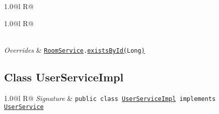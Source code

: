 \begin{adjustwidth}{1.5em}{0pt}
\begin{adjustwidth}{1.5em}{0pt}
\begin{adjustwidth}{1.5em}{0pt}
{\begin{tabularx}{1.0\linewidth}{@{}l R@{}}
{\begin{tabularx}{1.0\linewidth}{@{}l R@{}}
        \end{tabularx}} \\
        \hline
        \emph{Overrides} & \texttt{\texttt{\hyperref[edu.kit.hci.soli.service.RoomService]{\texttt{RoomService}}}.\hyperref[edu.kit.hci.soli.service.RoomService@existsById(java.lang.Long)]{existsById}\hyperref[edu.kit.hci.soli.service.RoomService@existsById(java.lang.Long)]{(}\texttt{Long}\hyperref[edu.kit.hci.soli.service.RoomService@existsById(java.lang.Long)]{)}} \\
        \hline
  
      \end{tabularx}}
    \end{adjustwidth}
  \end{adjustwidth}\subsection{Class UserServiceImpl\label{edu.kit.hci.soli.service.impl.UserServiceImpl} }
  \begin{adjustwidth}{1.5em}{0pt}
    {\begin{tabularx}{1.0\linewidth}{@{}l R@{}}
      \emph{Signature} & \texttt{public  class \texttt{\hyperref[edu.kit.hci.soli.service.impl.UserServiceImpl]{\texttt{UserServiceImpl}} implements \texttt{\hyperref[edu.kit.hci.soli.service.UserService]{\texttt{UserService}}}}} \\
      \hline
  

\end{tabularx}}
\end{adjustwidth}
\end{adjustwidth}
